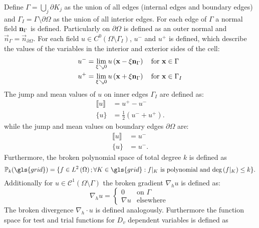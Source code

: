 Define  $\Gamma = \bigcup_j \partial K_j$ as the union of all edges (internal edges and boundary edges) and $\Gamma_I = \Gamma \setminus \partial \Omega$ as the union of all interior edges.
For each edge of $\Gamma$ a normal field $\textbf{n}_{\Gamma}$ is defined. Particularly on $\partial \Omega$ is defined as an outer normal and $\vec{n}_\Gamma = \vec{n}_{\partial\Omega}$.
For each field ${u} \in C^0\left(\Omega\setminus \Gamma_I\right)$, ${u}^-$  and  ${u}^+$ is defined, which describe the values of the variables in the interior and exterior sides of the cell:
\begin{align}
	{u}^- & = \lim_{\xi \searrow 0} {u}\left(\textbf{x} - \xi \textbf{n}_{\Gamma}\right) \quad \text{for } \textbf{x}\in \Gamma   \\
	{u}^+ & = \lim_{\xi \searrow 0} {u}\left(\textbf{x} + \xi \textbf{n}_{\Gamma}\right) \quad \text{for } \textbf{x}\in \Gamma_I
\end{align}
The jump and mean values of ${u}$ on inner edges $\Gamma_I$ are defined as:
\begin{align}
	\llbracket {u} \rrbracket & = {u}^+-{u}^-                           \\
	\{{u}\}                   & = \frac{1}{2} \left({u}^-+{u}^+\right).
\end{align}
while the jump and mean values on boundary edges $\partial \Omega$ are:
\begin{align}
	\llbracket {u} \rrbracket & = {u}^-  \\
	\{{u}\}                   & = {u}^-.
\end{align}
Furthermore, the broken polynomial space of total degree $k$ is defined as
\begin{equation}
	\mathbb{P}_k(\gls{grid} )= \{f \in L^2\left(\Omega\right); \forall K \in \gls{grid} : f\vert_{K} \text{ is polynomial and deg}\left(f\vert_{K}\right)\leq k \}.
	\label{Eq:PolSpace}
\end{equation}
Additionally for $u \in \mathcal{C}^1(\Omega \setminus \Gamma)$ the broken gradient $\nabla_h u$ is defined as:
\begin{equation}
	\nabla_h u
	= \begin{cases}
		0
		 & \text{on }\Gamma  \\
		\nabla u
		 & \text{elsewhere }
	\end{cases}
\end{equation}
The broken divergence  $\nabla_h \cdot u$ is defined analogously. Furthermore the function space for test and trial functions for $D_v$ dependent variables is defined as
